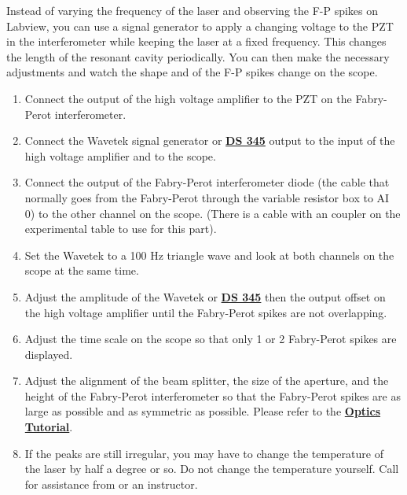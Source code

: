 \documentclass{../lab}
\begin{document}
Instead of varying the frequency of the laser and observing the F-P spikes on Labview, you can use a signal generator to apply a changing voltage to the PZT in the interferometer while keeping the laser at a fixed frequency. This changes the length of the resonant cavity periodically. You can then make the necessary adjustments and watch the shape and of the F-P spikes change on the scope.

\newpage

\begin{enumerate}
    \item Connect the output of the high voltage amplifier to the PZT on the Fabry-Perot interferometer.

    \item Connect the Wavetek signal generator or \href{https://youtu.be/PrM8DHFOFS0}{\textbf{DS 345}} output to the input of the high voltage amplifier and to the scope.

    \item Connect the output of the Fabry-Perot interferometer diode (the cable that normally goes from the Fabry-Perot through the variable resistor box to AI 0) to the other channel on the scope. (There is a cable with an coupler on the experimental table to use for this part).

    \item Set the Wavetek to a 100 Hz triangle wave and look at both channels on the scope at the same time.

    \item Adjust the amplitude of the Wavetek or \href{https://youtu.be/PrM8DHFOFS0}{\textbf{\textbf{DS 345}}} then  the output offset on the high voltage amplifier until the Fabry-Perot spikes are not overlapping.

    \item Adjust the time scale on the scope so that only 1 or 2 Fabry-Perot spikes are displayed.

    \item Adjust the alignment of the beam splitter, the size of the aperture, and the height of the Fabry-Perot interferometer so that the Fabry-Perot spikes are as large as possible and as symmetric as possible. Please refer to the \href{http://experimentationlab.berkeley.edu/OpticsTutorial}{\textbf{Optics Tutorial}}.

    \item If the peaks are still irregular, you may have to change the temperature of the laser by half a degree or so. Do not change the temperature yourself. Call for assistance from \LabEngineer or an instructor.

\end{enumerate}
\end{document}
